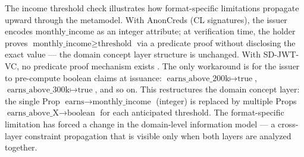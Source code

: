 The income threshold check illustrates how format-specific limitations propagate upward through the metamodel. With AnonCreds (CL signatures), the issuer encodes \(\text{monthly\_income}\) as an integer attribute; at verification time, the holder proves \(\text{monthly\_income} \geq \text{threshold}\) via a predicate proof without disclosing the exact value \citep{curran2022anoncreds} --- the domain concept layer structure is unchanged. With SD-JWT-VC, no predicate proof mechanism exists \citep{terbu_sd-jwt-based_2026}. The only workaround is for the issuer to pre-compute boolean claims at issuance: \(\text{earns\_above\_200k} \mapsto \text{true}\), \(\text{earns\_above\_300k} \mapsto \text{true}\), and so on. This restructures the domain concept layer: the single Prop \(\text{earns} \to \text{monthly\_income}\) (integer) is replaced by multiple Props \(\text{earns\_above\_X} \to \text{boolean}\) for each anticipated threshold. The format-specific limitation has forced a change in the domain-level information model --- a cross-layer constraint propagation that is visible only when both layers are analyzed together.

